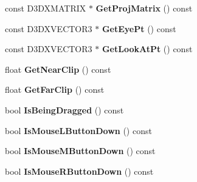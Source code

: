 \begin{DoxyCompactItemize}
\item 
\hypertarget{class_c_base_camera_abd1fd54b7481f136ff160528caac139a}{const D3\+D\+X\+M\+A\+T\+R\+I\+X $\ast$ {\bfseries Get\+Proj\+Matrix} () const }\label{class_c_base_camera_abd1fd54b7481f136ff160528caac139a}

\item 
\hypertarget{class_c_base_camera_ae08632cf51cc263cdd2d78eea8af442a}{const D3\+D\+X\+V\+E\+C\+T\+O\+R3 $\ast$ {\bfseries Get\+Eye\+Pt} () const }\label{class_c_base_camera_ae08632cf51cc263cdd2d78eea8af442a}

\item 
\hypertarget{class_c_base_camera_a9b4df40fa4654c10205d15ff79376e77}{const D3\+D\+X\+V\+E\+C\+T\+O\+R3 $\ast$ {\bfseries Get\+Look\+At\+Pt} () const }\label{class_c_base_camera_a9b4df40fa4654c10205d15ff79376e77}

\item 
\hypertarget{class_c_base_camera_ab99c79000b2d4fbf59c181032bccb95d}{float {\bfseries Get\+Near\+Clip} () const }\label{class_c_base_camera_ab99c79000b2d4fbf59c181032bccb95d}

\item 
\hypertarget{class_c_base_camera_a381de0e1f449208b1c2cb86e462c8643}{float {\bfseries Get\+Far\+Clip} () const }\label{class_c_base_camera_a381de0e1f449208b1c2cb86e462c8643}

\item 
\hypertarget{class_c_base_camera_a3928806e81783b1b3138833585d5f5d0}{bool {\bfseries Is\+Being\+Dragged} () const }\label{class_c_base_camera_a3928806e81783b1b3138833585d5f5d0}

\item 
\hypertarget{class_c_base_camera_a9b7c2e2595e2c7fff4afe8a92291feaf}{bool {\bfseries Is\+Mouse\+L\+Button\+Down} () const }\label{class_c_base_camera_a9b7c2e2595e2c7fff4afe8a92291feaf}

\item 
\hypertarget{class_c_base_camera_ae258726567f469b2e2bdbca54c3b9203}{bool {\bfseries Is\+Mouse\+M\+Button\+Down} () const }\label{class_c_base_camera_ae258726567f469b2e2bdbca54c3b9203}

\item 
\hypertarget{class_c_base_camera_a23062c3b30369799c572fdba7b61ef13}{bool {\bfseries Is\+Mouse\+R\+Button\+Down} () const }\label{class_c_base_camera_a23062c3b30369799c572fdba7b61ef13}

\end{DoxyCompactItemize}
